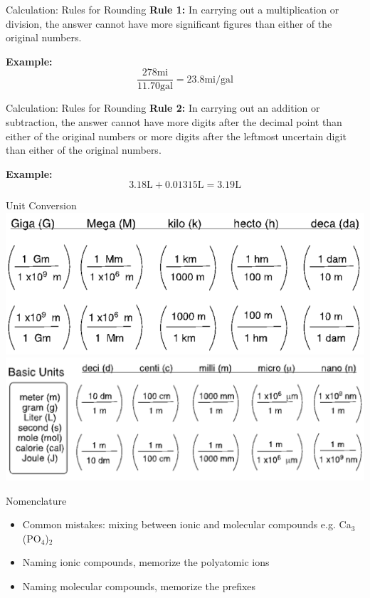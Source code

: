 \documentclass[11pt]{beamer}
\begin{document}
\begin{frame}{Calculation: Rules for Rounding}
  \textbf{Rule 1:} In carrying out a multiplication or division,
  the answer cannot have more significant figures than either of
  the original numbers.

  \textbf{Example:}
  \begin{equation}
    \frac{278 \text{mi}}{11.70 \text{gal}} = 23.8 \text{mi/gal}
  \end{equation}
  
\end{frame}

\begin{frame}{Calculation: Rules for Rounding}
  \textbf{Rule 2:} In carrying out an addition or subtraction, the
  answer cannot have more digits after the decimal point than either
  of the original numbers or more digits after the leftmost uncertain
  digit than either of the original numbers.

  \textbf{Example:}
  \begin{equation}
    3.18 \text{L} + 0.01315 \text{L} = 3.19 \text{L}
  \end{equation}
\end{frame}

\begin{frame}{Unit Conversion}
  \centering
  \includegraphics[scale=0.3]{metric_1}
  \includegraphics[scale=0.3]{metric_2}
\end{frame}

\begin{frame}{Nomenclature}
  \begin{itemize}
  \item Common mistakes: mixing between ionic and molecular
    compounds e.g. Ca$_3$(PO$_4$)$_2$
  \item Naming ionic compounds, memorize the polyatomic ions
  \item Naming molecular compounds, memorize the prefixes
  \end{itemize}
\end{frame}
\end{document}
